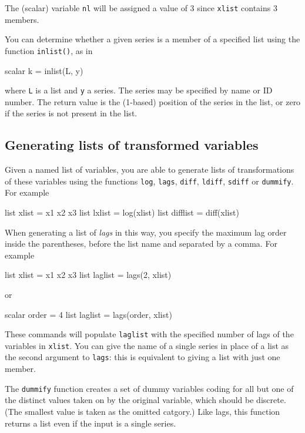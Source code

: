 The (scalar) variable \texttt{nl} will be assigned a value of 3 since
\texttt{xlist} contains 3 members.

You can determine whether a given series is a member of a specified
list using the function \texttt{inlist()}, as in
%
\begin{code}
scalar k = inlist(L, y)
\end{code}
%
where \texttt{L} is a list and \texttt{y} a series. The series may
be specified by name or ID number. The return value is the (1-based)
position of the series in the list, or zero if the series is not
present in the list. 

\subsection{Generating lists of transformed variables}

Given a named list of variables, you are able to generate lists of
transformations of these variables using the functions \texttt{log},
\texttt{lags}, \texttt{diff}, \texttt{ldiff}, \texttt{sdiff} or
\texttt{dummify}.  For example
%
\begin{code}
list xlist = x1 x2 x3
list lxlist = log(xlist)
list difflist = diff(xlist)
\end{code}

When generating a list of \textit{lags} in this way, you specify the
maximum lag order inside the parentheses, before the list name and
separated by a comma.  For example
%
\begin{code}
list xlist = x1 x2 x3
list laglist = lags(2, xlist)
\end{code}
%
or
%
\begin{code}
scalar order = 4
list laglist = lags(order, xlist)
\end{code}

These commands will populate \texttt{laglist} with the specified
number of lags of the variables in \texttt{xlist}.  You can give the
name of a single series in place of a list as the second argument to
\texttt{lags}: this is equivalent to giving a list with just one
member.

The \texttt{dummify} function creates a set of dummy variables coding
for all but one of the distinct values taken on by the original
variable, which should be discrete.  (The smallest value is taken as
the omitted catgory.)  Like lags, this function returns a list even if
the input is a single series.

